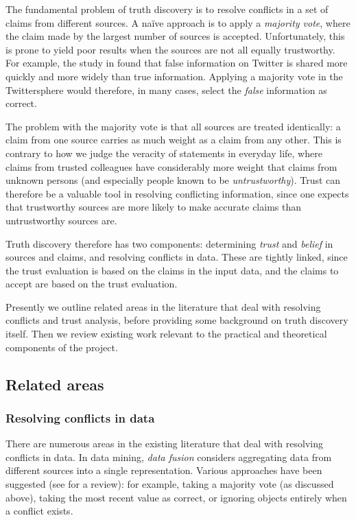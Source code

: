 \documentclass[../main.tex]{subfiles}
\begin{document}
The fundamental problem of truth discovery is to resolve conflicts in a set of
claims from different sources. A na\"ive approach is to apply a \emph{majority
vote}, where the claim made by the largest number of sources is accepted.
Unfortunately, this is prone to yield poor results when the sources are not all
equally trustworthy. For example, the study in \cite{vosoughi} found that false
information on Twitter is shared more quickly and more widely than true
information. Applying a majority vote in the Twittersphere would therefore, in
many cases, select the \emph{false} information as correct.

The problem with the majority vote is that all sources are treated identically:
a claim from one source carries as much weight as a claim from any other. This
is contrary to how we judge the veracity of statements in everyday life, where
claims from trusted colleagues have considerably more weight that claims from
unknown persons (and especially people known to be \emph{untrustworthy}). Trust
can therefore be a valuable tool in resolving conflicting information, since
one expects that trustworthy sources are more likely to make accurate claims
than untrustworthy sources are.

Truth discovery therefore has two components: determining \emph{trust} and
\emph{belief} in sources and claims, and resolving conflicts in data. These are
tightly linked, since the trust evaluation is based on the claims in the input
data, and the claims to accept are based on the trust evaluation.

Presently we outline related areas in the literature that deal with resolving
conflicts and trust analysis, before providing some background on truth
discovery itself. Then we review existing work relevant to the practical and
theoretical components of the project.

\subsection{Related areas}
\subsubsection{Resolving conflicts in data}

There are numerous areas in the existing literature that deal with resolving
conflicts in data. In data mining, \emph{data fusion} considers aggregating
data from different sources into a single representation. Various approaches
have been suggested (see \cite{bleiholder} for a review): for example, taking a
majority vote (as discussed above), taking the most recent value as correct, or
ignoring objects entirely when a conflict exists.
\end{document}
